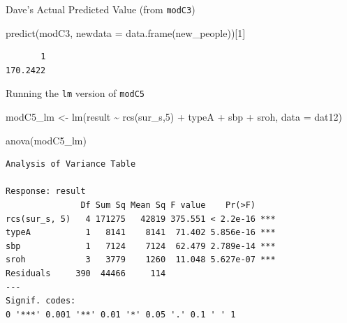 \documentclass[
  ignorenonframetext,
]{beamer}
\newenvironment{Shaded}{\begin{snugshade}}{\end{snugshade}}
\newcommand{\AttributeTok}[1]{\textcolor[rgb]{0.77,0.63,0.00}{#1}}
\newcommand{\DecValTok}[1]{\textcolor[rgb]{0.00,0.00,0.81}{#1}}
\newcommand{\FunctionTok}[1]{\textcolor[rgb]{0.00,0.00,0.00}{#1}}
\newcommand{\NormalTok}[1]{#1}
\newcommand{\OtherTok}[1]{\textcolor[rgb]{0.56,0.35,0.01}{#1}}
\newcommand{\SpecialCharTok}[1]{\textcolor[rgb]{0.00,0.00,0.00}{#1}}
\begin{document}
\begin{frame}[fragile]{Dave's Actual Predicted Value (from
\texttt{modC3})}
\protect\hypertarget{daves-actual-predicted-value-from-modc3}{}
\begin{Shaded}
\begin{Highlighting}[]
\FunctionTok{predict}\NormalTok{(modC3, }\AttributeTok{newdata =} \FunctionTok{data.frame}\NormalTok{(new\_people))[}\DecValTok{1}\NormalTok{]}
\end{Highlighting}
\end{Shaded}

\begin{verbatim}
       1 
170.2422 
\end{verbatim}
\end{frame}

\begin{frame}[fragile]{Running the \texttt{lm} version of
\texttt{modC5}}
\protect\hypertarget{running-the-lm-version-of-modc5}{}
\begin{Shaded}
\begin{Highlighting}[]
\NormalTok{modC5\_lm }\OtherTok{\textless{}{-}} \FunctionTok{lm}\NormalTok{(result }\SpecialCharTok{\textasciitilde{}} \FunctionTok{rcs}\NormalTok{(sur\_s,}\DecValTok{5}\NormalTok{) }\SpecialCharTok{+}\NormalTok{ typeA }\SpecialCharTok{+}\NormalTok{ sbp }\SpecialCharTok{+}\NormalTok{ sroh,}
               \AttributeTok{data =}\NormalTok{ dat12)}

\FunctionTok{anova}\NormalTok{(modC5\_lm)}
\end{Highlighting}
\end{Shaded}

\begin{verbatim}
Analysis of Variance Table

Response: result
               Df Sum Sq Mean Sq F value    Pr(>F)    
rcs(sur_s, 5)   4 171275   42819 375.551 < 2.2e-16 ***
typeA           1   8141    8141  71.402 5.856e-16 ***
sbp             1   7124    7124  62.479 2.789e-14 ***
sroh            3   3779    1260  11.048 5.627e-07 ***
Residuals     390  44466     114                      
---
Signif. codes:  
0 '***' 0.001 '**' 0.01 '*' 0.05 '.' 0.1 ' ' 1
\end{verbatim}
\end{frame}
\end{document}
